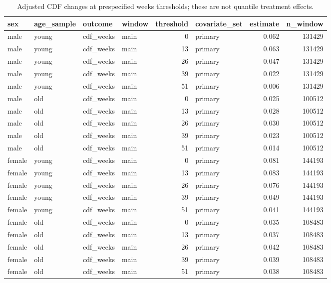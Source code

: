 \begin{table}

\caption{Adjusted CDF changes at prespecified weeks thresholds; these are not quantile treatment effects.}
\centering
\begin{tabular}[t]{llllrlrr}
\toprule
sex & age\_sample & outcome & window & threshold & covariate\_set & estimate & n\_window\\
\midrule
male & young & cdf\_weeks & main & 0 & primary & 0.062 & 131429\\
male & young & cdf\_weeks & main & 13 & primary & 0.063 & 131429\\
male & young & cdf\_weeks & main & 26 & primary & 0.047 & 131429\\
male & young & cdf\_weeks & main & 39 & primary & 0.022 & 131429\\
male & young & cdf\_weeks & main & 51 & primary & 0.006 & 131429\\
\addlinespace
male & old & cdf\_weeks & main & 0 & primary & 0.025 & 100512\\
male & old & cdf\_weeks & main & 13 & primary & 0.028 & 100512\\
male & old & cdf\_weeks & main & 26 & primary & 0.030 & 100512\\
male & old & cdf\_weeks & main & 39 & primary & 0.023 & 100512\\
male & old & cdf\_weeks & main & 51 & primary & 0.014 & 100512\\
\addlinespace
female & young & cdf\_weeks & main & 0 & primary & 0.081 & 144193\\
female & young & cdf\_weeks & main & 13 & primary & 0.083 & 144193\\
female & young & cdf\_weeks & main & 26 & primary & 0.076 & 144193\\
female & young & cdf\_weeks & main & 39 & primary & 0.049 & 144193\\
female & young & cdf\_weeks & main & 51 & primary & 0.041 & 144193\\
\addlinespace
female & old & cdf\_weeks & main & 0 & primary & 0.035 & 108483\\
female & old & cdf\_weeks & main & 13 & primary & 0.037 & 108483\\
female & old & cdf\_weeks & main & 26 & primary & 0.042 & 108483\\
female & old & cdf\_weeks & main & 39 & primary & 0.039 & 108483\\
female & old & cdf\_weeks & main & 51 & primary & 0.038 & 108483\\
\bottomrule
\end{tabular}
\end{table}
